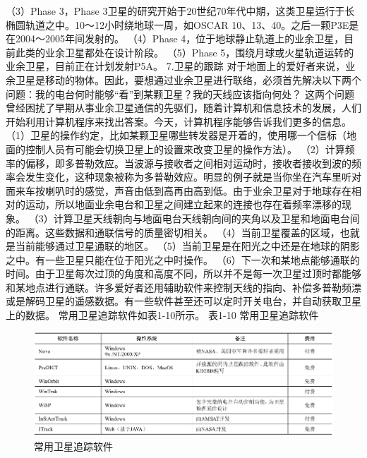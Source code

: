 \documentclass[12pt,UTF8]{ctexbook}
\begin{document}
（3）Phase 3，Phase 3卫星的研究开始于20世纪70年代中期，这类卫星运行于长椭圆轨道之中。10～12小时绕地球一周，如OSCAR 10、13、40。之后一颗P3E是在2004～2005年间发射的。
（4）Phase 4，位于地球静止轨道上的业余卫星，目前此类的业余卫星都处在设计阶段。
（5）Phase 5，围绕月球或火星轨道运转的业余卫星，目前正在计划发射P5A。
7.卫星的跟踪
对于地面上的爱好者来说，业余卫星是移动的物体。因此，要想通过业余卫星进行联络，必须首先解决以下两个问题：我的电台何时能够“看”到某颗卫星？我的天线应该指向何处？
这两个问题曾经困扰了早期从事业余卫星通信的先驱们，随着计算机和信息技术的发展，人们开始利用计算机程序来找出答案。今天，计算机程序能够告诉我们更多的信息。
（1）卫星的操作约定，比如某颗卫星哪些转发器是开着的，使用哪一个信标（地面的控制人员有可能会切换卫星上的设置来改变卫星的操作方法）。
（2）计算频率的偏移，即多普勒效应。当波源与接收者之间相对运动时，接收者接收到波的频率会发生变化，这种现象被称为多普勒效应。明显的例子就是当你坐在汽车里听对面来车按喇叭时的感觉，声音由低到高再由高到低。由于业余卫星对于地球存在相对的运动，所以地面业余电台和卫星之间建立起来的连接也存在着频率漂移的现象。
（3）计算卫星天线朝向与地面电台天线朝向间的夹角以及卫星和地面电台间的距离。这些数据和通联信号的质量密切相关。
（4）当前卫星覆盖的区域，也就是当前能够通过卫星通联的地区。
（5）当前卫星是在阳光之中还是在地球的阴影之中。有一些卫星只能在位于阳光之中时操作。
（6）下一次和某地点能够通联的时间。由于卫星每次过顶的角度和高度不同，所以并不是每一次卫星过顶时都能够和某地点进行通联。许多爱好者还用辅助软件来控制天线的指向、补偿多普勒频漂或是解码卫星的遥感数据。有一些软件甚至还可以定时开关电台，并自动获取卫星上的数据。
常用卫星追踪软件如表1-10所示。
表1-10 常用卫星追踪软件

\begin{figure}[htbp]
	\centering
	\includegraphics[width=0.7\linewidth]{92}
	\caption{常用卫星追踪软件}
	\label{fig:1}
\end{figure}
\end{document}

